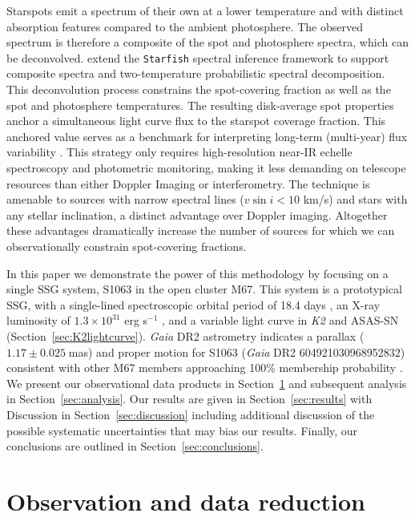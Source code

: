 \documentclass[trackchanges]{aastex631}
\begin{document}
Starspots emit a spectrum of their own at a lower temperature and with distinct absorption features compared to the ambient photosphere. The observed spectrum is therefore a composite of the spot and photosphere spectra, which can be deconvolved.  \citet{gullysantiago17} extend the \texttt{Starfish} \citep{czekala15} spectral inference framework to support composite spectra and two-temperature probabilistic spectral decomposition. This deconvolution process constrains the spot-covering fraction as well as the spot and photosphere temperatures. The resulting disk-average spot properties anchor a simultaneous light curve flux to the starspot coverage fraction. This anchored value serves as a benchmark for interpreting long-term (multi-year) flux variability \citep{neff95}. This strategy only requires high-resolution near-IR echelle spectroscopy and photometric monitoring, making it less demanding on telescope resources than either Doppler Imaging or interferometry. The technique is amenable to sources with narrow spectral lines ($v\sin{i}<10$ km/s) and stars with any stellar inclination, a distinct advantage over Doppler imaging.  Altogether these advantages dramatically increase the number of sources for which we can observationally constrain spot-covering fractions.

In this paper we demonstrate the power of this methodology by focusing on a single SSG system, S1063 \citep{1977A&AS...27...89S} in the open cluster M67. This system is a prototypical SSG, with a single-lined spectroscopic orbital period of 18.4 days \citep{geller17}, an X-ray luminosity of $1.3\times10^{31}$ erg s$^{-1}$ \citep{vandenberg99}, and a variable light curve in \textit{K2} and ASAS-SN (Section~\ref{sec:K2lightcurve}). \emph{Gaia} DR2 astrometry \citep{2016A&A...595A...1G, 2018A&A...616A...1G} indicates a parallax ($1.17\pm0.025 \;$mas) and proper motion for S1063 (\emph{Gaia} DR2 604921030968952832) consistent with other M67 members  approaching 100\% membership probability \citep{2018ApJ...869....9G}. We present our observational data products in Section~\ref{sec:observations} and subsequent analysis in Section~\ref{sec:analysis}. Our results are given in Section~\ref{sec:results} with Discussion in Section~\ref{sec:discussion} including additional discussion of the possible systematic uncertainties that may bias our results. Finally, our conclusions are outlined in Section~\ref{sec:conclusions}.


\section{Observation and data reduction}
\label{sec:observations}
\end{document}
